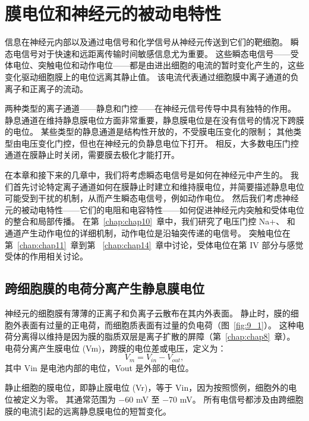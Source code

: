 \chapter{膜电位和神经元的被动电特性} \label{chap:chap9}

信息在神经元内部以及通过电信号和化学信号从神经元传送到它们的靶细胞。
瞬态电信号对于快速和远距离传输时间敏感信息尤为重要。
这些瞬态电信号——受体电位、突触电位和动作电位——都是由进出细胞的电流的暂时变化产生的，这些变化驱动细胞膜上的电位远离其静止值。
该电流代表通过细胞膜中离子通道的负离子和正离子的流动。


两种类型的离子通道——静息和门控——在神经元信号传导中具有独特的作用。
静息通道在维持静息膜电位方面非常重要，静息膜电位是在没有信号的情况下跨膜的电位。
某些类型的静息通道是结构性开放的，不受膜电压变化的限制；
其他类型由电压变化门控，但也在神经元的负静息电位下打开。
相反，大多数电压门控通道在膜静止时关闭，需要膜去极化才能打开。


在本章和接下来的几章中，我们将考虑瞬态电信号是如何在神经元中产生的。
我们首先讨论特定离子通道如何在膜静止时建立和维持膜电位，并简要描述静息电位可能受到干扰的机制，从而产生瞬态电信号，例如动作电位。
然后我们考虑神经元的被动电特性——它们的电阻和电容特性——如何促进神经元内突触和受体电位的整合和局部传播。
在第~\ref{chap:chap10}~章中，我们研究了电压门控 Na+、 和  通道产生动作电位的详细机制，动作电位是沿轴突传递的电信号。
突触电位在第~\ref{chap:chap11}~章到第 ~\ref{chap:chap14}~章中讨论，受体电位在第 IV 部分与感觉受体的作用相关讨论。



\section{跨细胞膜的电荷分离产生静息膜电位}

神经元的细胞膜有薄薄的正离子和负离子云散布在其内外表面。
静止时，膜的细胞外表面有过量的正电荷，而细胞质表面有过量的负电荷（图~\ref{fig:9_1}）。
这种电荷分离得以维持是因为膜的脂质双层是离子扩散的屏障（第~\ref{chap:chap8}~章）。
电荷分离产生膜电位 (Vm)，跨膜的电位差或电压，定义为：
\begin{equation}
	V_m = V_{in} - V_{out},
\end{equation}
其中 Vin 是电池内部的电位，Vout 是外部的电位。


静止细胞的膜电位，即静止膜电位 (Vr)，等于 Vin，因为按照惯例，细胞外的电位被定义为零。
其通常范围为 −60 mV 至 −70 mV。
所有电信号都涉及由跨细胞膜的电流引起的远离静息膜电位的短暂变化。


